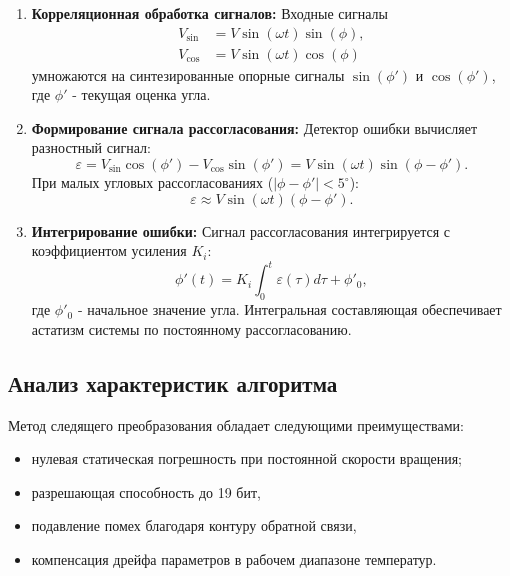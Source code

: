 \begin{enumerate}
    \item \textbf{Корреляционная обработка сигналов:}
    Входные сигналы 
    \begin{align*}
        V_{\sin} &= V \sin(\omega t) \sin(\phi), \\
        V_{\cos} &= V \sin(\omega t) \cos(\phi)
    \end{align*}
    умножаются на синтезированные 
    опорные сигналы $\sin(\phi')$ и $\cos(\phi')$, где $\phi'$ - текущая оценка угла.
    
    \item \textbf{Формирование сигнала рассогласования:}
    Детектор ошибки вычисляет разностный сигнал:
    \begin{equation}
        \varepsilon = V_{\sin} \cos(\phi') - V_{\cos} \sin(\phi') = V \sin(\omega t) \sin(\phi - \phi').
        \label{eq:error}
    \end{equation}
    При малых угловых рассогласованиях ($|\phi - \phi'| < 5^\circ$):
    \begin{equation}
        \varepsilon \approx V \sin(\omega t) (\phi - \phi').
        \label{eq:error_approx}
    \end{equation}
    
    \item \textbf{Интегрирование ошибки:}
    Сигнал рассогласования интегрируется с коэффициентом усиления $K_i$:
    \begin{equation}
        \phi'(t) = K_i \int_0^t \varepsilon(\tau) d\tau + \phi'_0,
        \label{eq:integration}
    \end{equation}
    где $\phi'_0$ - начальное значение угла. Интегральная составляющая обеспечивает астатизм системы по постоянному рассогласованию.
\end{enumerate}

\subsection{Анализ характеристик алгоритма}
Метод следящего преобразования обладает следующими преимуществами:
\begin{itemize}
    \item нулевая статическая погрешность при постоянной скорости вращения;
    \item разрешающая способность до 19 бит,
    \item подавление помех благодаря контуру обратной связи,
    \item компенсация дрейфа параметров в рабочем диапазоне температур.
\end{itemize}

